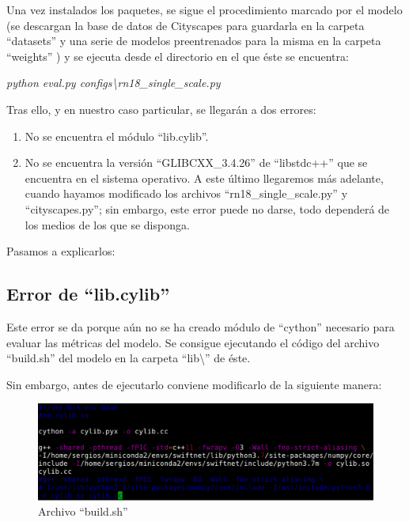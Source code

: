 Una vez instalados los paquetes, se sigue el procedimiento marcado por el modelo (se descargan la base de datos de Cityscapes \cite{cityscapes} para guardarla en la carpeta ``datasets'' y una serie de modelos preentrenados para la misma en la carpeta ``weights'' \cite{github_swiftnet}) y se ejecuta desde el directorio en el que éste se encuentra:

\begin{center}
\textit{python eval.py configs\textbackslash{rn18\_single\_scale.py}}
\end{center}

Tras ello, y en nuestro caso particular, se llegarán a dos errores:

\begin{enumerate}
\item No se encuentra el módulo ``lib.cylib''.
\item No se encuentra la versión ``GLIBCXX\_3.4.26'' de ``libstdc++'' que se encuentra en el sistema operativo. A este último llegaremos más adelante, cuando hayamos modificado los archivos ``rn18\_single\_scale.py'' y ``cityscapes.py''; sin embargo, este error puede no darse, todo dependerá de los medios de los que se disponga.
\end{enumerate}

Pasamos a explicarlos:

\subsection{Error de ``lib.cylib''}

Este error se da porque aún no se ha creado módulo de ``cython'' \cite{cython} necesario para evaluar las métricas del modelo. Se consigue ejecutando el código del archivo ``build.sh'' del modelo en la carpeta ``lib\textbackslash{}'' de éste.

Sin embargo, antes de ejecutarlo conviene modificarlo de la siguiente manera:

\begin{figure}[H]
  \centering
  \includegraphics[width=12cm]{Figuras/cylib.eps}
  \caption{Archivo ``build.sh''}
  \label{fig:cylib}
\end{figure}

